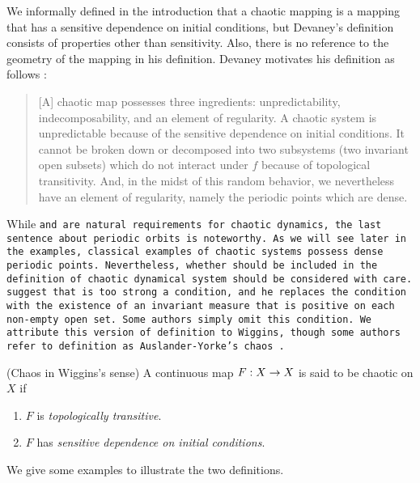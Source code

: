 \documentclass[10pt,draft,twoside]{book}
\begin{document}
We informally defined in the introduction that a chaotic mapping is a mapping that has a sensitive dependence on initial conditions, but Devaney's definition consists of properties other than sensitivity.
Also, there is no reference to the geometry of the mapping in his definition.
Devaney motivates his definition as follows \citep[p.50]{devaney}:
\begin{quotation}
  [A] chaotic map possesses three ingredients:
  unpredictability, indecomposability, and an element of regularity.
  A chaotic system is unpredictable because of the sensitive dependence on initial conditions.
  It cannot be broken down or decomposed into two subsystems (two invariant open subsets) which do not interact under $f$ because of topological transitivity.
  And, in the midst of this random behavior, we nevertheless have an element of regularity, namely the periodic points which are dense.
\end{quotation}
While \tt and \sdic are natural requirements for chaotic dynamics, the last sentence about periodic orbits is noteworthy.
As we will see later in the examples, classical examples of chaotic systems possess dense periodic points.
Nevertheless, whether \dpp should be included in the definition of chaotic dynamical system should be considered with care.
\citet{glasner} suggest that \dpp is too strong a condition, and he replaces the condition with the existence of an invariant measure that is positive on each non-empty open set. 
Some authors simply omit this condition.
We attribute this version of definition to Wiggins, though some authors refer to definition as Auslander-Yorke's chaos \citep{blanchard}.
\begin{definition}
  (Chaos in Wiggins's sense)
  A continuous map $F: X\rightarrow X$ is said to be chaotic on $X$ if
  \begin{enumerate}
    \item $F$ is \textit{topologically transitive}.
    \item $F$ has \textit{sensitive dependence on initial conditions}.
  \end{enumerate}
\end{definition}
We give some examples to illustrate the two definitions.
\end{document}
